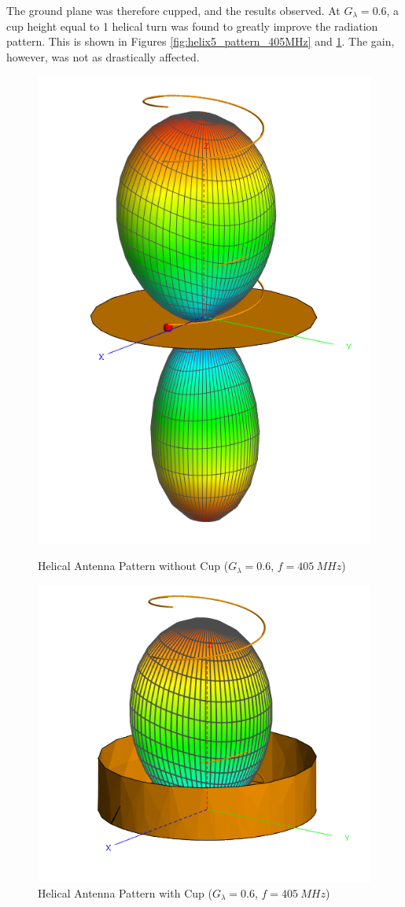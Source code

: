 The ground plane was therefore cupped, and the results observed. At $G_\lambda = 0.6$, a cup height equal to 1 helical turn was found to greatly improve the radiation pattern. This is shown in Figures \ref{fig:helix5_pattern_405MHz} and \ref{fig:helix6_pattern_405MHz}. The gain, however, was not as drastically affected.

\begin{figure}[!htb]
  \begin{minipage}{.49\textwidth}
    \centering
    \includegraphics[width=0.5\linewidth]{helix5_pattern_405MHz}
    \caption{Helical Antenna Pattern without Cup ($G_\lambda = 0.6$, $f=\SI{405}{MHz}$)}
    \label{fig:helix5_pattern_405MHz}
  \end{minipage}
  \begin{minipage}{.49\textwidth}
    \centering
    \includegraphics[width=0.75\linewidth]{helix6_pattern_405MHz}
    \caption{Helical Antenna Pattern with Cup ($G_\lambda = 0.6$, $f=\SI{405}{MHz}$)}
    \label{fig:helix6_pattern_405MHz}
  \end{minipage}
\end{figure}

